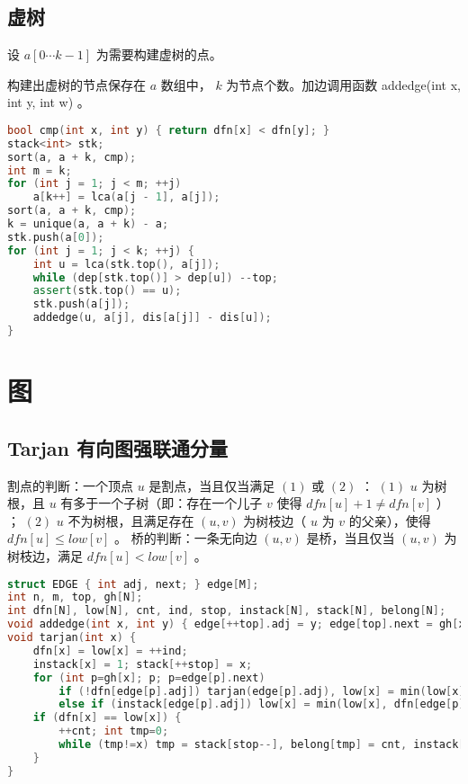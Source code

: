 \documentclass[landscape,a4paper]{article}
\begin{document}
\subsection{虚树}

设 $a[0 \cdots k - 1]$ 为需要构建虚树的点。

构建出虚树的节点保存在 $a$ 数组中， $k$ 为节点个数。加边调用函数 addedge(int x, int y, int w) 。

\begin{lstlisting}[language=C++]
bool cmp(int x, int y) { return dfn[x] < dfn[y]; }
stack<int> stk;
sort(a, a + k, cmp);
int m = k;
for (int j = 1; j < m; ++j)
	a[k++] = lca(a[j - 1], a[j]);
sort(a, a + k, cmp);
k = unique(a, a + k) - a;
stk.push(a[0]);
for (int j = 1; j < k; ++j) {
	int u = lca(stk.top(), a[j]);
	while (dep[stk.top()] > dep[u]) --top;
	assert(stk.top() == u);
	stk.push(a[j]);
	addedge(u, a[j], dis[a[j]] - dis[u]);
}
\end{lstlisting}

\section{图}

\subsection{Tarjan 有向图强联通分量}
 割点的判断：一个顶点 $u$ 是割点，当且仅当满足 $(1)$ 或 $(2)$ ： $(1)$ $u$ 为树根，且 $u$ 有多于一个子树（即：存在一个儿子 $v$ 使得 $dfn[u] + 1 \neq dfn[v]$ ） ； $(2)$ $u$ 不为树根，且满足存在 $(u, v)$ 为树枝边（ $u$ 为 $v$ 的父亲），使得 $dfn[u] \leq low[v]$ 。
 桥的判断：一条无向边 $(u, v)$ 是桥，当且仅当 $(u, v)$ 为树枝边，满足 $dfn[u] < low[v]$ 。
\begin{lstlisting}[language=C++]
struct EDGE { int adj, next; } edge[M];
int n, m, top, gh[N];
int dfn[N], low[N], cnt, ind, stop, instack[N], stack[N], belong[N];
void addedge(int x, int y) { edge[++top].adj = y; edge[top].next = gh[x]; gh[x] = top; }
void tarjan(int x) {
	dfn[x] = low[x] = ++ind;
	instack[x] = 1; stack[++stop] = x;
	for (int p=gh[x]; p; p=edge[p].next)
		if (!dfn[edge[p].adj]) tarjan(edge[p].adj), low[x] = min(low[x], low[edge[p].adj]);
		else if (instack[edge[p].adj]) low[x] = min(low[x], dfn[edge[p].adj]);
	if (dfn[x] == low[x]) {
		++cnt; int tmp=0;
		while (tmp!=x) tmp = stack[stop--], belong[tmp] = cnt, instack[tmp] = 0;
	}
}
\end{lstlisting}
\end{document}
